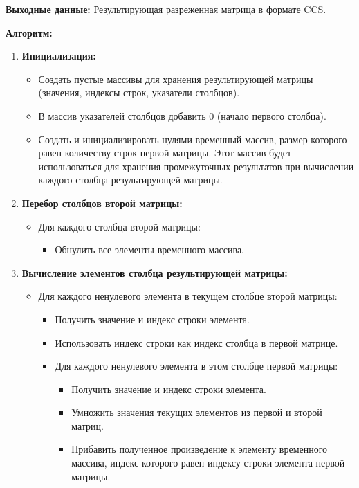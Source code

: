 \documentclass[12pt]{article}
\begin{document}
\textbf{Выходные данные:} Результирующая разреженная матрица в формате CCS.

\textbf{Алгоритм:}

\begin{enumerate}
    \item \textbf{Инициализация:}
        \begin{itemize}
            \item Создать пустые массивы для хранения результирующей матрицы (значения, индексы строк, указатели столбцов).
            \item В массив указателей столбцов добавить 0 (начало первого столбца).
            \item Создать и инициализировать нулями временный массив, размер которого равен количеству строк первой матрицы. Этот массив будет использоваться для хранения промежуточных результатов при вычислении каждого столбца результирующей матрицы.
        \end{itemize}

    \item \textbf{Перебор столбцов второй матрицы:}
        \begin{itemize}
            \item Для каждого столбца второй матрицы:
            \begin{itemize}
                \item Обнулить все элементы временного массива.
            \end{itemize}
        \end{itemize}

    \item \textbf{Вычисление элементов столбца результирующей матрицы:}
        \begin{itemize}
            \item Для каждого ненулевого элемента в текущем столбце второй матрицы:
                \begin{itemize}
                    \item  Получить значение и индекс строки элемента.
                    \item Использовать индекс строки как индекс столбца в первой матрице.
                    \item Для каждого ненулевого элемента в этом столбце первой матрицы:
                        \begin{itemize}
                            \item Получить значение и индекс строки элемента.
                            \item Умножить значения текущих элементов из первой и второй матриц.
                            \item  Прибавить полученное произведение к элементу временного массива, индекс которого равен индексу строки элемента первой матрицы.
                        \end{itemize}
                \end{itemize}
         \end{itemize}


\end{enumerate}
\end{document}
